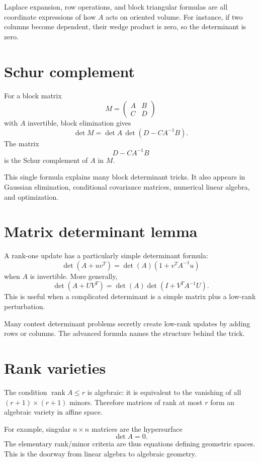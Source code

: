 Laplace expansion, row operations, and block triangular formulas are all coordinate expressions of how $A$ acts on oriented volume.  For instance, if two columns become dependent, their wedge product is zero, so the determinant is zero.

\section{Schur complement}

For a block matrix
\[
  M=\begin{pmatrix}A&B\\C&D\end{pmatrix}
\]
with $A$ invertible, block elimination gives
\[
  \det M=\det A\,\det(D-CA^{-1}B).
\]
The matrix
\[
  D-CA^{-1}B
\]
is the Schur complement of $A$ in $M$.

This single formula explains many block determinant tricks.  It also appears in Gaussian elimination, conditional covariance matrices, numerical linear algebra, and optimization.

\section{Matrix determinant lemma}

A rank-one update has a particularly simple determinant formula:
\[
  \det(A+uv^T)=\det(A)(1+v^TA^{-1}u)
\]
when $A$ is invertible.  More generally,
\[
  \det(A+UV^T)=\det(A)\det(I+V^TA^{-1}U).
\]
This is useful when a complicated determinant is a simple matrix plus a low-rank perturbation.

Many contest determinant problems secretly create low-rank updates by adding rows or columns.  The advanced formula names the structure behind the trick.

\section{Rank varieties}

The condition $\operatorname{rank}A\le r$ is algebraic: it is equivalent to the vanishing of all $(r+1)\times(r+1)$ minors.  Therefore matrices of rank at most $r$ form an algebraic variety in affine space.

For example, singular $n\times n$ matrices are the hypersurface
\[
  \det A=0.
\]
The elementary rank/minor criteria are thus equations defining geometric spaces.  This is the doorway from linear algebra to algebraic geometry.

